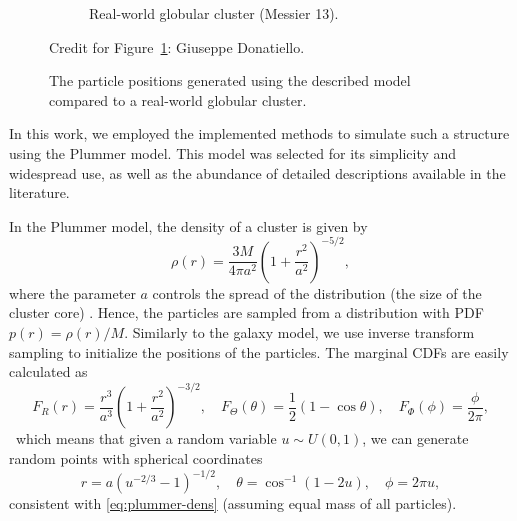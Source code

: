 \begin{figure}[!ht]
\begin{subfigure}[b]{0.4\textwidth}
        \caption{Real-world globular cluster (Messier 13).}
        \label{fig:messier-13}
    \end{subfigure}

    \vspace{0.5em}
    {\footnotesize
        Credit for Figure~\ref{fig:messier-13}: Giuseppe Donatiello. \par}

    \caption{The particle positions generated using the described model compared to a real-world globular cluster.}
    \label{fig:globular-cluster-gen-vs-real}
\end{figure}
In this work, we employed the implemented methods to simulate such a structure using the Plummer model.
This model was selected for its simplicity and widespread use, as well as the abundance of detailed descriptions available in the literature.

In the Plummer model, the density of a cluster is given by
\begin{equation}\label{eq:plummer-dens}
    \rho(r) = \frac{3M}{4\pi a^2}\left(1 + \frac{r^2}{a^2} \right)^{-5/2},
\end{equation}
where the parameter $a$ controls the spread of the distribution (the size of the cluster core) \cite{Aarseth1974Comparison}.
Hence, the particles are sampled from a distribution with PDF $p(r) = \rho(r) / M$.
Similarly to the galaxy model, we use inverse transform sampling to initialize the positions of the particles.
The marginal CDFs are easily calculated as
\begin{equation*}
    F_R(r) = \frac{r^3}{a^3}\left( 1+\frac{r^2}{a^2} \right)^{-3/2}, \quad
    F_\Theta (\theta) = \frac{1}{2}(1-\cos\theta), \quad
    F_\Phi (\phi) = \frac{\phi}{2\pi},
\end{equation*}\
which means that given a random variable $u\sim U(0, 1)$, we can generate random points with spherical coordinates
\begin{equation}\label{eq:plummer-random-init-pos}
    r = a(u^{-2/3}-1)^{-1/2}, \quad \theta = \cos^{-1}(1-2u), \quad \phi = 2\pi u,
\end{equation}
consistent with \autoref{eq:plummer-dens} (assuming equal mass of all particles).

